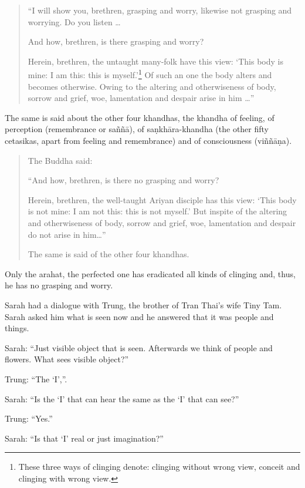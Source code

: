 \begin{quote}
    
``I will show you, brethren, grasping and worry, likewise not grasping
and worrying. Do you listen \ldots{}

And how, brethren, is there grasping and worry?

Herein, brethren, the untaught many-folk have this view: `This body is
mine: I am this: this is myself.'\footnote{These three ways of
clinging denote: clinging without wrong view, conceit and clinging with
wrong view.} Of such an one the body
alters and becomes otherwise. Owing to the altering and otherwiseness of
body, sorrow and grief, woe, lamentation and despair arise in him \ldots''

\end{quote}

The same is said about the other four khandhas, the khandha of feeling,
of perception (remembrance or saññā), of saṇkhāra-khandha (the other
fifty cetasikas, apart from feeling and remembrance) and of
consciousness (viññāṇa).

\begin{quote}
    
The Buddha said:

``And how, brethren, is there no grasping and worry?

Herein, brethren, the well-taught Ariyan disciple has this view: `This
body is not mine: I am not this: this is not myself.' But inspite of the
altering and otherwiseness of body, sorrow and grief, woe, lamentation
and despair do not arise in him\ldots{}''

The same is said of the other four khandhas.
\end{quote}

Only the arahat, the perfected one has eradicated all kinds of clinging
and, thus, he has no grasping and worry.

Sarah had a dialogue with Trung, the brother of Tran Thai's wife Tiny
Tam. Sarah asked him what is seen now and he answered that it was people
and things.

Sarah: ``Just visible object that is seen. Afterwards we think of people
and flowers. What sees visible object?''

Trung: ``The `I',''.

Sarah: ``Is the `I' that can hear the same as the `I' that can see?''

Trung: ``Yes.''

Sarah: ``Is that `I' real or just imagination?''

